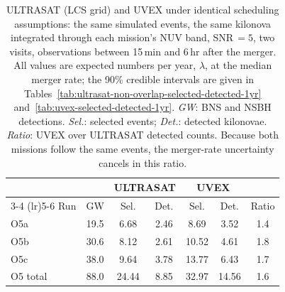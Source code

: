 \begin{table}[!htb]
\centering
\renewcommand\arraystretch{1.15}
\setlength{\tabcolsep}{0.14cm}
\caption{ULTRASAT (LCS grid) and UVEX under identical scheduling assumptions:
the same simulated events, the same kilonova integrated through each mission's
NUV band, SNR\,$=5$, two visits, observations between 15\,min and 6\,hr after
the merger. All values are expected numbers per year, $\lambda$, at the median
merger rate; the 90\% credible intervals are given in
Tables~\ref{tab:ultrasat-non-overlap-selected-detected-1yr}
and~\ref{tab:uvex-selected-detected-1yr}. \emph{GW}: BNS and NSBH detections.
\emph{Sel.}: selected events; \emph{Det.}: detected kilonovae.
\emph{Ratio}: UVEX over ULTRASAT detected counts. Because both missions follow
the same events, the merger-rate uncertainty cancels in this ratio.}
\label{tab:mission-comparison}
\begin{tabular}{lcccccc}
\toprule
 & & \multicolumn{2}{c}{ULTRASAT} & \multicolumn{2}{c}{UVEX} & \\
\cmidrule(lr){3-4} \cmidrule(lr){5-6}
Run & GW & Sel. & Det. & Sel. & Det. & Ratio \\
\midrule
O5a & 19.5 & 6.68 & 2.46 & 8.69 & 3.52 & 1.4 \\
O5b & 30.6 & 8.12 & 2.61 & 10.52 & 4.61 & 1.8 \\
O5c & 38.0 & 9.64 & 3.78 & 13.77 & 6.43 & 1.7 \\
\midrule
O5 total & 88.0 & 24.44 & 8.85 & 32.97 & 14.56 & 1.6 \\
\bottomrule
\end{tabular}
\end{table}
